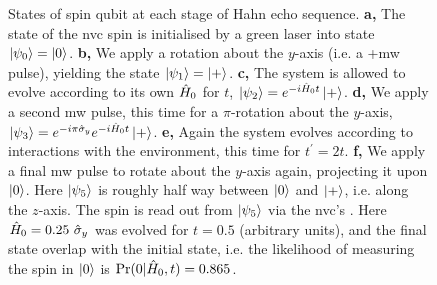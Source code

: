 \begin{figure}
\begin{center}
{        }
        \qquad
    \end{center}
    \caption[States of spin qubit at each stage of Hahn echo sequence]{
        States of spin qubit at each stage of Hahn echo sequence.
        \textbf{a,} The state of the \gls{nvc} spin is initialised by a green laser into state $\ket{\psi_0} = \ket{0}$. 
        \textbf{b,} We apply a rotation about the $y$-axis (i.e. a \glsxtrfull+{mw} pulse), 
            yielding the state $\ket{\psi_1} = \ket{+}$. 
        \textbf{c,} The system is allowed to evolve according to its own $\hat{H}_0$ for $t$, $\ket{\psi_2} = e^{-i\hat{H}_0 t}\ket{+}$.
        \textbf{d,} We apply a second \gls{mw} pulse, this time for a $\pi$-rotation about the $y$-axis, 
        $\ket{\psi_3} = e^{-i\pi \hat{\sigma}_y}e^{-i\hat{H}_0 t}\ket{+}$.
        \textbf{e,} Again the system evolves according to interactions with the environment, this time for $t^{\prime} = 2t$.
        \textbf{f,} We apply a final \gls{mw} pulse to rotate about the $y$-axis again, 
            projecting it upon $\ket{0}$.
        Here $\ket{\psi_5}$ is roughly half way between $\ket{0}$ and $\ket{+}$, 
        i.e. along the $z$-axis. 
        The spin is read out from $\ket{\psi_5}$ via the \gls{nvc}'s . 
        Here $\hat{H}_0 = 0.25 \ \hat{\sigma}_y$ was evolved for $t=0.5$ (arbitrary units), 
        and the final state overlap with the initial state, 
        i.e. the \gls{likelihood} of measuring the spin in $\ket{0}$ is $\Pr(0 | \hat{H}_0, t) = 0.865$. 
    }
    \label{fig:hahn_bloch_spheres}
\end{figure}


